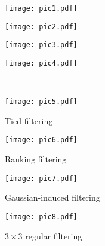 \documentclass[letterpaper]{article} \usepackage{aaai19}  \usepackage{times}  \usepackage{helvet}  \usepackage{courier}  \usepackage{url}  \usepackage{graphicx}  \frenchspacing  \setlength{\pdfpagewidth}{8.5in}  \setlength{\pdfpageheight}{11in}
\begin{document}
\begin{figure*}[t]
	\centering
	\begin{subfigure}{0.15\textwidth}
		\centering
		\texttt{[image: pic1.pdf]}
		\caption{}
		\label{fig:motivation:A}
	\end{subfigure}
	\quad \quad \quad \quad
	\begin{subfigure}{0.17\textwidth}
		\centering
		\texttt{[image: pic2.pdf]}
		\caption{}
		\label{fig:motivation:B}	
	\end{subfigure}
	\quad \quad \quad \quad
	\begin{subfigure}{0.16\textwidth}
		\centering
		\texttt{[image: pic3.pdf]}
		\caption{}
		\label{fig:motivation:C}
	\end{subfigure}
	\quad \quad \quad \quad
	\begin{subfigure}{0.15\textwidth}
		\centering
		\texttt{[image: pic4.pdf]}
		\caption{}
		\label{fig:motivation:D}
	\end{subfigure}
	\\ 
	\begin{subfigure}{0.19\textwidth}
		\centering
		\texttt{[image: pic5.pdf]}
		\caption{Tied filtering}
		\label{fig:motivation:E}
	\end{subfigure}
	\quad \quad
	\begin{subfigure}{0.23\textwidth}
		\centering
		\texttt{[image: pic6.pdf]}
		\caption{Ranking filtering}
		\label{fig:motivation:F}
	\end{subfigure}
	\quad \quad
	\begin{subfigure}{0.20\textwidth}
		\centering
		\texttt{[image: pic7.pdf]}
		\caption{Gaussian-induced filtering}
		\label{fig:motivation:G}
	\end{subfigure}
	\quad \quad
	\begin{subfigure}{0.17\textwidth}
		\centering
		\texttt{[image: pic8.pdf]}
		\caption{$3\times 3$ regular filtering}
		\label{fig:motivation:H}
	\end{subfigure}

\end{figure*}
\end{document}
